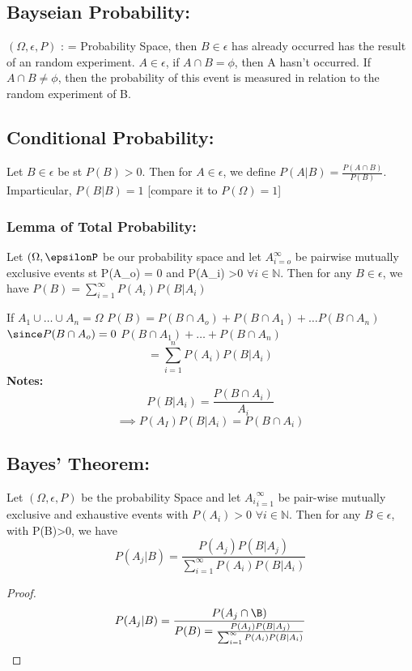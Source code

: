 \documentclass{article}
\theoremstyle{definition}
\begin{document}
\subsection{Bayseian Probability:}
$(\Omega, \epsilon, P)$ : = Probability Space, then $B \in \epsilon$ has already occurred has the result of an random experiment. $A\in \epsilon$, if $A \cap B = \phi$, then A hasn't occurred. If $A \cap B \neq \phi$, then the probability of this event is measured in relation to the random experiment of B.

\subsection{Conditional Probability:}
Let $ B \in \epsilon $ be st $P(B) > 0$. Then for $A\in \epsilon$, we define $P(A|B) = \frac{P(A \cap B)}{P(B)}$.
\\
Imparticular, $P(B|B) = 1$ [compare it to $P(\Omega) =1$]


\subsubsection{Lemma of Total Probability:}
Let $(\Omega, \epsilonP$ be our probability space and let ${A}_{i=o}^{\infty}$ be pairwise mutually exclusive events st P(A_o) = 0 and 
P(A_i) >0 $\forall i \in \mathbb{N}$. Then for any $B\in \epsilon$, we have $P(B) = \sum_{i=1}^{\infty} P(A_i) P(B|A_i)$




If $A_1 \cup \dots \cup A_n = \Omega$
$P(B) = P(B\cap A_o) + P(B\cap A_1) + \dots P(B\cap A_n)$ 
$\since P(B\cap A_o) =0$
$P(B\cap A_1 ) + \dots + P(B \cap A_n)$
\[
= \sum_{i=1}^{n} P(A_i) P(B|A_i)
\]
\textbf{Notes:}
\[
P(B|A_i) = \frac{ P(B \cap A_i)}{A_i}
\]
\[
\implies P(A_I)P(B|A_i) = P(B \cap A_i)
\]

\subsection{Bayes' Theorem:}
Let $(\Omega, \epsilon, P)$ be the probability Space and let ${A_i}_{i=1}^{\infty}$ be pair-wise mutually exclusive and exhaustive events with $P(A_i)>0 $   $\forall i \in \mathbb N$. Then for any $B \in \epsilon$, with P(B)>0, we have 
\[
P(A_j|B) = \frac{P(A_j)P(B|A_j)}{\sum_{i=1}^{\infty}P(A_i)P(B|A_i)}
\]
\begin{proof}
    \[
    P(A_j|B) = \frac{P(A_j \cap \B)}{P(B) = \frac{P(A_j)P(B|A_j)}{\sum_{i=1}^{\infty}P(A_i)P(B|A_i)}}
    \]
\end{proof}
\end{document}
